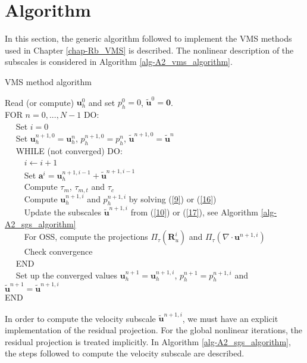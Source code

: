 \section*{Algorithm}
In this section, the generic algorithm followed to implement the VMS methods used in Chapter \ref{chap-Rb_VMS} is described. The nonlinear description of the subscales is considered in Algorithm \ref{alg-A2_vms_algorithm}.

\begin{algorithm}
\caption{VMS method algorithm}
\label{alg-A2_vms_algorithm}
Read (or compute) $ \mathbf{u}_h^0 $ and set $ p_h^0=0 $, $ \tilde{\mathbf{u}}^0=\mathbf{0} $.\\
FOR $ n=0,...,N-1 $ DO:\\
$\quad$ Set $ i=0 $\\
$\quad$ Set $ \mathbf{u}_h^{n+1,0}=\mathbf{u}_h^n $, $ p_h^{n+1,0}=p_h^n $, $ \tilde{\mathbf{u}}^{n+1,0}=\tilde{\mathbf{u}}^n $\\
$\quad$ WHILE (not converged) DO:\\
$\quad\quad$ $ i\leftarrow i+1 $\\
$\quad\quad$ Set $ \mathbf{a}^i=\mathbf{u}_h^{n+1,i-1}+\tilde{\mathbf{u}}^{n+1,i-1} $\\
$\quad\quad$ Compute $ \tau_m $, $ \tau_{m,t} $ and $ \tau_c $\\
$\quad\quad$ Compute $ \mathbf{u}_h^{n+1,i} $ and $ p_h^{n+1,i} $ by solving (\ref{9}) or (\ref{16})\\
$\quad\quad$ Update the subscales $ \tilde{\mathbf{u}}^{n+1,i} $ from (\ref{10}) or (\ref{17}), see Algorithm \ref{alg-A2_sgs_algorithm}\\
$\quad\quad$ For OSS, compute the projections $ \Pi_\tau(\mathbf{R}_u^{i}) $ and $ \Pi_\tau(\nabla\cdot\mathbf{u}^{n+1,i}) $\\
$\quad\quad$ Check convergence\\
$\quad$ END\\
$\quad$ Set up the converged values $ \mathbf{u}_h^{n+1}=\mathbf{u}_h^{n+1,i} $, $ p_h^{n+1}=p_h^{n+1,i} $ and $ \tilde{\mathbf{u}}^{n+1}=\tilde{\mathbf{u}}^{n+1,i} $\\
END
\end{algorithm}

In order to compute the velocity subscale $ \tilde{\mathbf{u}}^{n+1,i} $, we must have an explicit implementation of the residual projection. For the global nonlinear iterations, the residual projection is treated implicitly. In Algorithm \ref{alg-A2_sgs_algorithm}, the steps followed to compute the velocity subscale are described.


